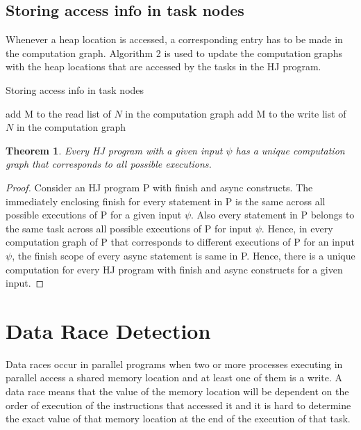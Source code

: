 \documentclass[10pt]{article}
\newtheorem{theorem}{Theorem}
\begin{document}
\subsection{Storing access info in task nodes}
Whenever a heap location is accessed, a corresponding entry has to be made in the computation graph. Algorithm 2 is used to update the computation graphs with the heap locations that are accessed by the tasks in the HJ program.
\begin{algorithm}
\caption{Storing access info in task nodes}
\begin{algorithmic}[h]
		\State add M to the read list of $N$ in the computation graph
	\Else
		\State add M to the write list of $N$ in the computation graph	
	\EndIf
\EndFunction
\end{algorithmic}
\end{algorithm}

\begin{theorem}
Every HJ program with a given input $\psi$ has a unique computation graph that corresponds to all possible executions.
\end{theorem}

\begin{proof}
Consider an HJ program P with finish and async constructs. The immediately enclosing finish for every statement in P is the same across all possible executions of P for a given input $\psi$. Also every statement in P belongs to the same task across all possible executions of P for input $\psi$. Hence, in every computation graph of P that corresponds to different executions of P for an input $\psi$, the finish scope of every async statement is same in P. Hence, there is a unique computation for every HJ program with finish and async constructs for a given input.
\end{proof}

\section{Data Race Detection}

Data races occur in parallel programs when two or more processes executing in parallel access a shared memory location and at least one of them is a write. A data race means that the value of the memory location will be dependent on the order of execution of the instructions that accessed it and it is hard to determine the exact value of that memory location at the end of the execution of that task.
\end{document}
